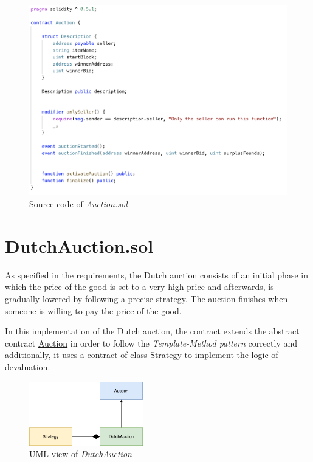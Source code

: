 \documentclass[runningheads,a4paper]{llncs}
\begin{document}
\begin{figure}[h]
\includegraphics[width=\linewidth,]{images/auction.png}
\centering
\caption{Source code of \emph{Auction.sol}}
\label{fig:auction}
\end{figure}


\newpage
\section{DutchAuction.sol}
As specified in the requirements, the Dutch auction consists of an initial phase in which the price of the good is set to a very high price and afterwards, is gradually lowered by following a precise strategy. The auction finishes when someone is willing to pay the price of the good.

In this implementation of the Dutch auction, the contract extends the abstract contract \url{Auction} in order to  follow the \emph{Template-Method pattern} correctly and additionally, it uses a contract of class \url{Strategy} to implement the logic of devaluation.

\begin{figure}
\includegraphics[width=140pt]{images/dutchUML.png}
\centering
\caption{UML view of \emph{DutchAuction}}
\label{fig:dutchUML}
\end{figure}
\end{document}
